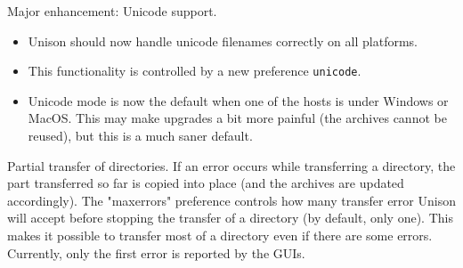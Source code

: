 \begin{changesfromversion}{2.32}
\item Major enhancement: Unicode support.
\begin{itemize}
\item Unison should now handle unicode filenames correctly on all platforms.
\item This functionality is controlled by a new preference {\tt unicode}.
\item Unicode mode is now the default when one of the hosts is under
  Windows or MacOS.  This may make upgrades a bit more painful (the
  archives cannot be reused), but this is a much saner default.
\end{itemize}
\item Partial transfer of directories.  If an error occurs while
  transferring a directory, the part transferred so far is copied into
  place (and the archives are updated accordingly).
  The "maxerrors" preference controls how many transfer error Unison
  will accept before stopping the transfer of a directory (by default,
  only one).  This makes it possible to transfer most of a directory
  even if there are some errors.  Currently, only the first error is
  reported by the GUIs.


\end{changesfromversion}
